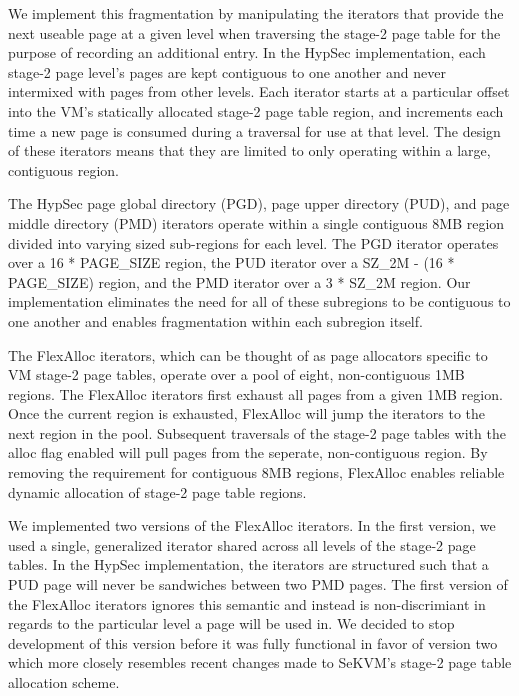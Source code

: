 We implement this fragmentation by manipulating the iterators that provide the next useable
page at a given level when traversing the stage-2 page table for the purpose of recording
an additional entry. In the HypSec implementation, each stage-2 page level's pages are
kept contiguous to one another and never intermixed with pages from other levels.
Each iterator starts at a particular offset into the VM's statically allocated stage-2
page table region, and increments each time a new page is consumed during a traversal
for use at that level. The design of these iterators means that they are limited to
only operating within a large, contiguous region.

The HypSec page global directory (PGD), page upper directory (PUD), and page middle directory
(PMD) iterators operate within a single contiguous 8MB region divided into varying sized
sub-regions for each level. The PGD iterator operates over a 16 * PAGE_SIZE region, the PUD
iterator over a SZ_2M - (16 * PAGE_SIZE) region, and the PMD iterator over a 3 * SZ_2M region.
Our implementation eliminates the need for all of these subregions to be contiguous to
one another and enables fragmentation within each subregion itself.

The FlexAlloc iterators, which can be thought of as page allocators specific to VM stage-2
page tables, operate over a pool of eight, non-contiguous 1MB regions. The FlexAlloc iterators
first exhaust all pages from a given 1MB region. Once the current region is exhausted, FlexAlloc
will jump the iterators to the next region in the pool. Subsequent traversals of the
stage-2 page tables with the alloc flag enabled will pull pages from the seperate,
non-contiguous region. By removing the requirement for contiguous 8MB regions, FlexAlloc
enables reliable dynamic allocation of stage-2 page table regions.

We implemented two versions of the FlexAlloc iterators. In the first version, we used a single,
generalized iterator shared across all levels of the stage-2 page tables. In the HypSec implementation,
the iterators are structured such that a PUD page will never be sandwiches between two PMD pages.
The first version of the FlexAlloc iterators ignores this semantic and instead is non-discrimiant
in regards to the particular level a page will be used in. We decided to stop development of this
version before it was fully functional in favor of version two which more closely resembles recent changes made to SeKVM's
stage-2 page table allocation scheme.

